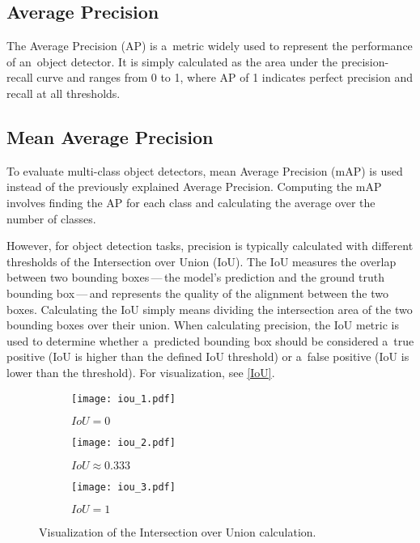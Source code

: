 \subsection*{Average Precision}

The Average Precision (AP) is a~metric widely used to represent the performance
of an~object detector. It is simply calculated as the area under the
precision-recall curve and ranges from 0 to 1, where AP of 1 indicates perfect
precision and recall at all thresholds.

\subsection*{Mean Average Precision}

To evaluate multi-class object detectors, mean Average Precision (mAP) is used
instead of the previously explained Average Precision. Computing the mAP
involves finding the AP for each class and calculating the average over the
number of classes.

However, for object detection tasks, precision is typically calculated with
different thresholds of the Intersection over Union (IoU). The IoU
measures the overlap between two bounding boxes\,---\,the model's
prediction and the ground truth bounding box\,---\,and represents the quality of the
alignment between the two boxes. Calculating the IoU simply means dividing the
intersection area of the two bounding boxes over their union. When calculating
precision, the IoU metric is used to determine whether a~predicted bounding box
should be considered a~true positive (IoU is higher than the defined IoU
threshold) or a~false positive (IoU is lower than the threshold). For
visualization, see \autoref{IoU}.

\begin{figure}[t]
    \centering
    \begin{subfigure}[b]{0.3125\textwidth}
        \texttt{[image: iou\_1.pdf]}
        \caption{$IoU = 0$}
    \end{subfigure}
    \hfill
    \begin{subfigure}[b]{0.2272727\textwidth}
        \texttt{[image: iou\_2.pdf]}
        \caption{$IoU \approx 0.333$}
    \end{subfigure}
    \hfill
    \begin{subfigure}[b]{0.15151515\textwidth}
        \texttt{[image: iou\_3.pdf]}
        \caption{$IoU = 1$}
    \end{subfigure}

    \caption{Visualization of the Intersection over Union calculation.}
    \label{IoU}
\end{figure}

